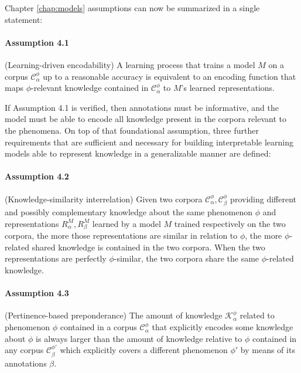 \documentclass[a4paper, nobind]{templates/ociamthesis}
\begin{document}
Chapter \ref{chap:models} assumptions can now be summarized in a single statement:

\vspace{-12pt}

\paragraph{Assumption 4.1} (Learning-driven encodability) A learning process that trains a model \(M\) on a corpus \(\mathcal{C}^\phi_\alpha\) up to a reasonable accuracy is equivalent to an encoding function that maps \(\phi\)-relevant knowledge contained in \(\mathcal{C}^\phi_\alpha\) to \(M\)'s learned representations.

\vspace{10pt}

If Assumption 4.1 is verified, then annotations must be informative, and the model must be able to encode all knowledge present in the corpora relevant to the phenomena. On top of that foundational assumption, three further requirements that are sufficient and necessary for building interpretable learning models able to represent knowledge in a generalizable manner are defined:

\paragraph{Assumption 4.2} (Knowledge-similarity interrelation) Given two corpora \(\mathcal{C}^\phi_\alpha, \mathcal{C}^\phi_\beta\) providing different and possibly complementary knowledge about the same phenomenon \(\phi\) and representations \(R^{M}_{\alpha}, R^{M}_{\beta}\) learned by a model \(M\) trained respectively on the two corpora, the more those representations are similar in relation to \(\phi\), the more \(\phi\)-related shared knowledge is contained in the two corpora. When the two representations are perfectly \(\phi\)-similar, the two corpora share the same \(\phi\)-related knowledge.

\paragraph{Assumption 4.3} (Pertinence-based preponderance) The amount of knowledge \(\mathcal{K}^\phi_\alpha\) related to phenomenon \(\phi\) contained in a corpus \(\mathcal{C}^{\phi}_\alpha\) that explicitly encodes some knowledge about \(\phi\) is always larger than the amount of knowledge relative to \(\phi\) contained in any corpus \(\mathcal{C}^{\phi'}_\beta\) which explicitly covers a different phenomenon \(\phi'\) by means of its annotations \(\beta\).
\end{document}
